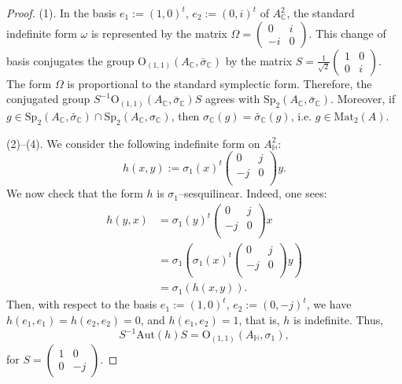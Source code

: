 \documentclass[10pt,a4paper]{amsart}
\begin{document}
\begin{proof}
(1). In the basis $e_1:=(1,0)^t$, $e_2:=(0,i)^t$ of $A_\mathbb C^2$, the standard indefinite form $\omega$ is represented by the matrix $\Omega=\begin{pmatrix}
    0 & i \\
    -i & 0
\end{pmatrix}$. This change of basis conjugates the group $\mathrm{O}_{(1,1)}(A_\mathbb C,\bar\sigma_\mathbb C)$ by the matrix $S=\frac{1}{\sqrt{2}}\begin{pmatrix}
    1 & 0 \\
    0 & i
\end{pmatrix}$.
The form $\Omega$ is proportional to the standard symplectic form. Therefore, the conjugated group $S^{-1}\mathrm{O}_{(1,1)}(A_\mathbb C,\bar\sigma_\mathbb C)S$ agrees with $\mathrm{Sp}_{2}(A_\mathbb C,\bar\sigma_\mathbb C)$.  Moreover, if $g\in \mathrm{Sp}_{2}(A_\mathbb C,\bar\sigma_\mathbb C)\cap \mathrm{Sp}_{2}(A_\mathbb C,\sigma_\mathbb C)$, then $\sigma_\mathbb C(g)=\bar\sigma_\mathbb C(g)$, i.e. $g\in\mathrm{Mat}_2(A)$.
\vspace{2mm}

\noindent (2)--(4). We consider the following indefinite form on $A_{\mathbb{H}}^{2}$:
\[h(x,y):={{\sigma }_{1}}{{(x)}^{t}}\begin{pmatrix}
   0 & j  \\
   -j & 0  \\
\end{pmatrix}y.\]
We now check that the form $h$ is ${{\sigma }_{1}}$--sesquilinear. Indeed, one sees: 
\begin{align*}
h(y,x)  & =\sigma_1(y)^t\begin{pmatrix}
   0 & j  \\
   -j & 0  \\
\end{pmatrix}x\\
 & =\sigma_1\left( \sigma_1(x)^t\begin{pmatrix}
   0 & j  \\
   -j & 0  \\
\end{pmatrix}y \right)\\
& =\sigma_1\left( h(x,y) \right).
\end{align*}
Then, with respect to the basis $e_1:=\left(1,0\right)^t$, $e_2:=\left(0,-j\right)^t$, we have $h\left( {{e}_{1}},{{e}_{1}} \right)=h\left( {{e}_{2}},{{e}_{2}} \right)=0$, and $h\left( {{e}_{1}},{{e}_{2}} \right)=1$, that is, $h$ is indefinite. Thus, 
$$S^{-1}\mathrm{Aut}(h)S=\mathrm{O}_{(1,1)}(A_\mathbb H,\sigma_1),$$
for $S=\begin{pmatrix}
    1 & 0 \\
    0 & -j 
\end{pmatrix}$.


\end{proof}
\end{document}
